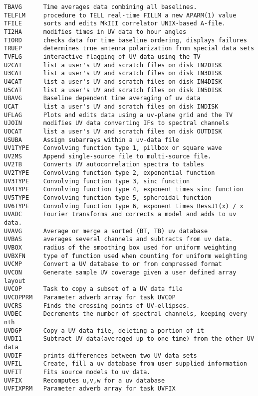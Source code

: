 \begin{verbatim}
TBAVG      Time averages data combining all baselines.
TELFLM     procedure to TELL real-time FILLM a new APARM(1) value
TFILE      sorts and edits MkIII correlator UNIX-based A-file.
TI2HA      modifies times in UV data to hour angles
TIORD      checks data for time baseline ordering, displays failures
TRUEP      determines true antenna polarization from special data sets
TVFLG      interactive flagging of UV data using the TV
U2CAT      list a user's UV and scratch files on disk IN2DISK
U3CAT      list a user's UV and scratch files on disk IN3DISK
U4CAT      list a user's UV and scratch files on disk IN4DISK
U5CAT      list a user's UV and scratch files on disk IN5DISK
UBAVG      Baseline dependent time averaging of uv data
UCAT       list a user's UV and scratch files on disk INDISK
UFLAG      Plots and edits data using a uv-plane grid and the TV
UJOIN      modifies UV data converting IFs to spectral channels
UOCAT      list a user's UV and scratch files on disk OUTDISK
USUBA      Assign subarrays within a uv-data file
UV1TYPE    Convolving function type 1, pillbox or square wave
UV2MS      Append single-source file to multi-source file.
UV2TB      Converts UV autocorrelation spectra to tables
UV2TYPE    Convolving function type 2, exponential function
UV3TYPE    Convolving function type 3, sinc function
UV4TYPE    Convolving function type 4, exponent times sinc function
UV5TYPE    Convolving function type 5, spheroidal function
UV6TYPE    Convolving function type 6, exponent times BessJ1(x) / x
UVADC      Fourier transforms and corrects a model and adds to uv data.
UVAVG      Average or merge a sorted (BT, TB) uv database
UVBAS      averages several channels and subtracts from uv data.
UVBOX      radius of the smoothing box used for uniform weighting
UVBXFN     type of function used when counting for uniform weighting
UVCMP      Convert a UV database to or from compressed format
UVCON      Generate sample UV coverage given a user defined array layout
UVCOP      Task to copy a subset of a UV data file
UVCOPPRM   Parameter adverb array for task UVCOP
UVCRS      Finds the crossing points of UV-ellipses.
UVDEC      Decrements the number of spectral channels, keeping every nth
UVDGP      Copy a UV data file, deleting a portion of it
UVDI1      Subtract UV data(averaged up to one time) from the other UV data
UVDIF      prints differences between two UV data sets
UVFIL      Create, fill a uv database from user supplied information
UVFIT      Fits source models to uv data.
UVFIX      Recomputes u,v,w for a uv database
UVFIXPRM   Parameter adverb array for task UVFIX

\end{verbatim}
